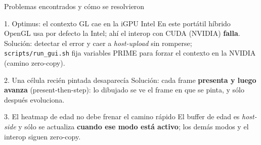 \documentclass[aspectratio=169]{beamer}
\begin{document}
\begin{frame}{Problemas encontrados y cómo se resolvieron}
    \footnotesize
    \begin{block}{1. Optimus: el contexto GL cae en la iGPU Intel}
        En este portátil híbrido OpenGL usa por defecto la Intel; ahí el interop
        con CUDA (NVIDIA) \textbf{falla}. \alert{Solución:} detectar el error y caer
        a \emph{host-upload} sin romperse; \texttt{scripts/run\_gui.sh} fija
        variables PRIME para forzar el contexto en la NVIDIA (camino zero-copy).
    \end{block}
    \begin{block}{2. Una célula recién pintada desaparecía}
        \alert{Solución:} cada frame \textbf{presenta y luego avanza}
        (present-then-step): lo dibujado se ve el frame en que se pinta, y sólo
        después evoluciona.
    \end{block}
    \begin{block}{3. El heatmap de edad no debe frenar el camino rápido}
        El buffer de edad es \emph{host-side} y sólo se actualiza \textbf{cuando ese
        modo está activo}; los demás modos y el interop siguen zero-copy.
    \end{block}
\end{frame}
\end{document}
